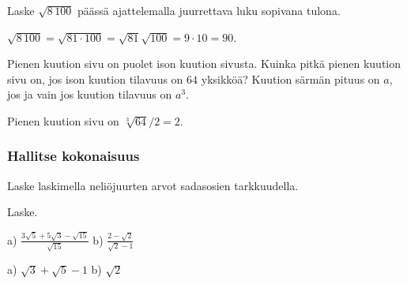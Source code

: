 \begin{tehtavasivu}
\begin{tehtava}
Laske $\sqrt{8\,100}$ päässä ajattelemalla juurrettava luku sopivana tulona.
\begin{vastaus}
$\sqrt{8\,100}=\sqrt{81\cdot100}=\sqrt{81}\sqrt{100}=9\cdot 10=90$.
\end{vastaus}
\end{tehtava}

\begin{tehtava}
Pienen kuution sivu on puolet ison kuution sivusta. Kuinka pitkä pienen kuution sivu on, jos ison kuution tilavuus on $64$ yksikköä? Kuution särmän pituus on $a$, jos ja vain jos kuution tilavuus on $a^3$.
	\begin{vastaus}
Pienen kuution sivu on $\sqrt[3]{64}/2=2$.
	\end{vastaus}
\end{tehtava}

\subsubsection*{Hallitse kokonaisuus}

\begin{tehtava}
Laske laskimella neliöjuurten arvot sadasosien tarkkuudella.
	\begin{vastaus}
	\end{vastaus}
\end{tehtava}

Laske.
\begin{tehtava}
\begin{vastaus}
\end{vastaus}
\end{tehtava}

\begin{tehtava} 
a) $ \frac{3\sqrt{5}+5\sqrt{3}-\sqrt{15}}{\sqrt{15}}$  \quad b)  $ \frac{2-\sqrt{2}}{\sqrt{2}-1}$   \quad
\begin{vastaus}
a) $\sqrt{3}+\sqrt{5}-1$ \quad b) $\sqrt{2}$ \quad
\end{vastaus}
\end{tehtava}


\end{tehtavasivu}
